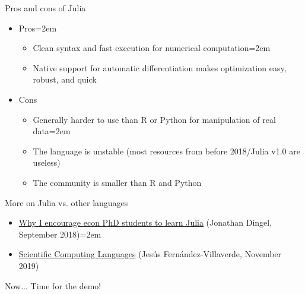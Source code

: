 \documentclass[handout]{beamer}
\begin{document}
\begin{frame}{Pros and cons of Julia}
\begin{itemize}
    \item Pros\itemsep=2em
    \begin{itemize}
        \item Clean syntax and fast execution for numerical computation\itemsep=2em
        \item Native support for automatic differentiation makes optimization easy, robust, and quick
    \end{itemize}
    \item<2-> Cons
    \begin{itemize}
        \item Generally harder to use than R or Python for manipulation of real data\itemsep=2em
        \item The language is unstable (most resources from before 2018/Julia v1.0 are useless)
        \item The community is smaller than R and Python
    \end{itemize}
\end{itemize}
\end{frame}

\begin{frame}{More on Julia vs. other languages}
\begin{itemize}
    \item \href{https://tradediversion.net/2018/09/17/why-i-encourage-econ-phd-students-to-learn-julia/}{Why I encourage econ PhD students to learn Julia} (Jonathan Dingel, September 2018)\itemsep=2em
    \item \href{https://www.sas.upenn.edu/~jesusfv/Lecture_HPC_5_Scientific_Computing_Languages.pdf}{Scientific Computing Languages} (Jesús Fernández-Villaverde, November 2019)
\end{itemize}
\end{frame}

\begin{frame}{Now...}
Time for the demo!
\end{frame}
\end{document}

